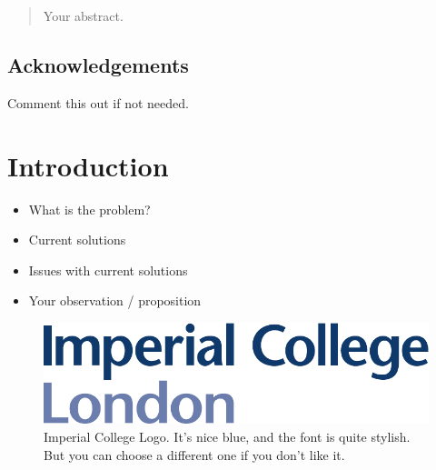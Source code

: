 \documentclass[12pt,twoside]{report}
\date{September 2019}
\begin{document}



\clearpage{\pagestyle{empty}\cleardoublepage}
\setcounter{page}{1}
\pagestyle{fancy}

\begin{abstract}
Your abstract.
\end{abstract}

\cleardoublepage
\section*{Acknowledgements}
Comment this out if not needed.

\clearpage{\pagestyle{empty}\cleardoublepage}

\tableofcontents 


\clearpage{\pagestyle{empty}\cleardoublepage}
\setcounter{page}{1}
\fancyhead[LE,RO]{\slshape \rightmark}
\fancyhead[LO,RE]{\slshape \leftmark}

\chapter{Introduction}

\begin{itemize}

    \item What is the problem?
    \item Current solutions
    \item Issues with current solutions
    \item Your observation / proposition

\end{itemize}

\begin{figure}[tb]
\centering
\includegraphics[width = 0.4\hsize]{./figures/imperial}
\caption{Imperial College Logo. It's nice blue, and the font is quite stylish. But you can choose a different one if you don't like it.}
\label{fig:logo}
\end{figure}
\end{document}
